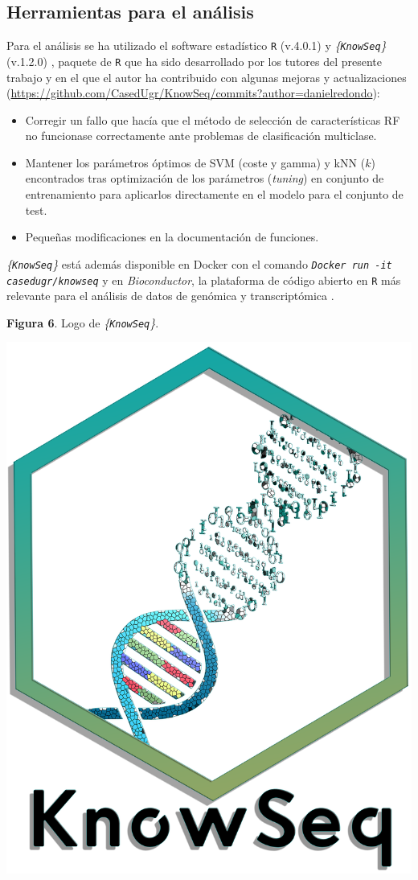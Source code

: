 \subsection{Herramientas para el análisis}

Para el análisis se ha utilizado el software estadístico \texttt{R} (v.4.0.1) \cite{R} y \textit{\{\texttt{KnowSeq}\}} (v.1.2.0) \cite{KnowSeq}, paquete de \texttt{R} que ha sido desarrollado por los tutores del presente trabajo y en el que el autor ha contribuido con algunas mejoras y actualizaciones (\url{https://github.com/CasedUgr/KnowSeq/commits?author=danielredondo}):

\begin{itemize}
	\item Corregir un fallo que hacía que el método de selección de características RF no funcionase correctamente ante problemas de clasificación multiclase.
	\item Mantener los parámetros óptimos de SVM (coste y gamma) y kNN ($k$) encontrados tras optimización de los parámetros (\textit{tuning}) en conjunto de entrenamiento para aplicarlos directamente en el modelo para el conjunto de test.
	\item Pequeñas modificaciones en la documentación de funciones.
\end{itemize}

\textit{\{\texttt{KnowSeq}\}} está además disponible en Docker con el comando \textit{\texttt{Docker run -it casedugr/knowseq}} y en \textit{Bioconductor}, la plataforma de código abierto en \texttt{R} más relevante para el análisis de datos de genómica y transcriptómica \cite{Gentleman2004}.\\

\begin{center}
\textbf{Figura 6}. Logo de \textit{\{\texttt{KnowSeq}\}}.
\end{center}
\begin{center}
	\includegraphics[width=.3\textwidth]{figuras/06_logo_knowseq.png} 
\end{center}

